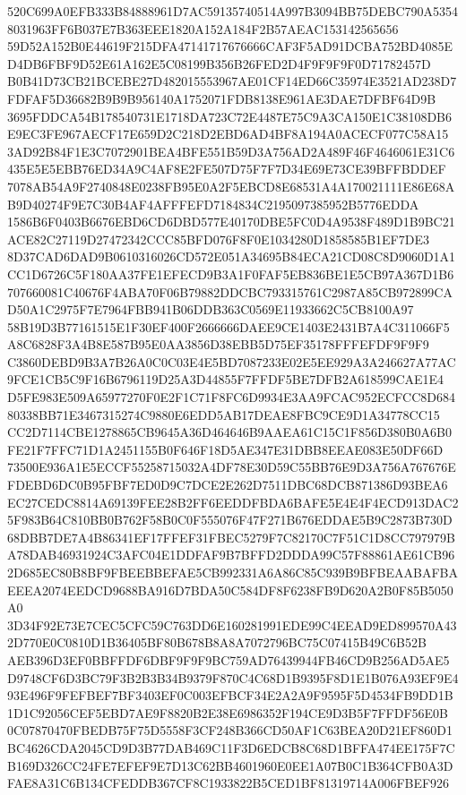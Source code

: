 \documentclass[UTF8,fontset=fandol,zihao=-4,a4paper]{ctexart}
\begin{document}
{{520C699A0EFB333B84888961D7AC59135740514A997B3094BB75DEBC790A53548031963FF6B037E7B363EEE1820A152A184F2B57AEAC153142565656
59D52A152B0E44619F215DFA47141717676666CAF3F5AD91DCBA752BD4085ED4DB6FBF9D52E61A162E5C08199B356B26FED2D4F9F9F9F0D71782457D
B0B41D73CB21BCEBE27D482015553967AE01CF14ED66C35974E3521AD238D7FDFAF5D36682B9B9B956140A1752071FDB8138E961AE3DAE7DFBF64D9B
3695FDDCA54B178540731E1718DA723C72E4487E75C9A3CA150E1C38108DB6E9EC3FE967AECF17E659D2C218D2EBD6AD4BF8A194A0ACECF077C58A15
3AD92B84F1E3C7072901BEA4BFE551B59D3A756AD2A489F46F4646061E31C6435E5E5EBB76ED34A9C4AF8E2FE507D75F7F7D34E69E73CE39BFFBDDEF
7078AB54A9F2740848E0238FB95E0A2F5EBCD8E68531A4A170021111E86E68AB9D40274F9E7C30B4AF4AFFFEFD7184834C2195097385952B5776EDDA
1586B6F0403B6676EBD6CD6DBD577E40170DBE5FC0D4A9538F489D1B9BC21ACE82C27119D27472342CCC85BFD076F8F0E1034280D1858585B1EF7DE3
8D37CAD6DAD9B0610316026CD572E051A34695B84ECA21CD08C8D9060D1A1CC1D6726C5F180AA37FE1EFECD9B3A1F0FAF5EB836BE1E5CB97A367D1B6
707660081C40676F4ABA70F06B79882DDCBC793315761C2987A85CB972899CAD50A1C2975F7E7964FBB941B06DDB363C0569E11933662C5CB8100A97
58B19D3B77161515E1F30EF400F2666666DAEE9CE1403E2431B7A4C311066F5A8C6828F3A4B8E587B95E0AA3856D38EBB5D75EF35178FFFEFDF9F9F9
C3860DEBD9B3A7B26A0C0C03E4E5BD7087233E02E5EE929A3A246627A77AC9FCE1CB5C9F16B6796119D25A3D44855F7FFDF5BE7DFB2A618599CAE1E4
D5FE983E509A65977270F0E2F1C71F8FC6D9934E3AA9FCAC952ECFCC8D68480338BB71E3467315274C9880E6EDD5AB17DEAE8FBC9CE9D1A34778CC15
CC2D7114CBE1278865CB9645A36D464646B9AAEA61C15C1F856D380B0A6B0FE21F7FFC71D1A2451155B0F646F18D5AE347E31DBB8EEAE083E50DF66D
73500E936A1E5ECCF55258715032A4DF78E30D59C55BB76E9D3A756A767676EFDEBD6DC0B95FBF7ED0D9C7DCE2E262D7511DBC68DCB871386D93BEA6
EC27CEDC8814A69139FEE28B2FF6EEDDFBDA6BAFE5E4E4F4ECD913DAC25F983B64C810BB0B762F58B0C0F555076F47F271B676EDDAE5B9C2873B730D
68DBB7DE7A4B86341EF17FFEF31FBEC5279F7C82170C7F51C1D8CC797979BA78DAB46931924C3AFC04E1DDFAF9B7BFFD2DDDA99C57F88861AE61CB96
2D685EC80B8BF9FBEEBBEFAE5CB992331A6A86C85C939B9BFBEAABAFBAEEEA2074EEDCD9688BA916D7BDA50C584DF8F6238FB9D620A2B0F85B5050A0
3D34F92E73E7CEC5CFC59C763DD6E160281991EDE99C4EEAD9ED899570A432D770E0C0810D1B36405BF80B678B8A8A7072796BC75C07415B49C6B52B
AEB396D3EF0BBFFDF6DBF9F9F9BC759AD76439944FB46CD9B256AD5AE5D9748CF6D3BC79F3B2B3B34B9379F870C4C68D1B9395F8D1E1B076A93EF9E4
93E496F9FEFBEF7BF3403EF0C003EFBCF34E2A2A9F9595F5D4534FB9DD1B1D1C92056CEF5EBD7AE9F8820B2E38E6986352F194CE9D3B5F7FFDF56E0B
0C07870470FBEDB75F75D5558F3CF248B366CD50AF1C63BEA20D21EF860D1BC4626CDA2045CD9D3B77DAB469C11F3D6EDCB8C68D1BFFA474EE175F7C
B169D326CC24FE7EFEF9E7D13C62BB4601960E0EE1A07B0C1B364CFB0A3DFAE8A31C6B134CFEDDB367CF8C1933822B5CED1BF81319714A006FBEF926
}}
\end{document}
